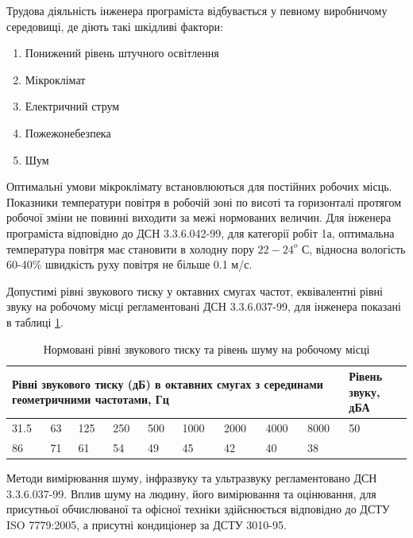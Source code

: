 \documentclass[ukrainian,utf8,simple,floatsubsection, hpadding=5mm,equationsubsection,]{eskdtext}
\begin{document}
Трудова діяльність інженера програміста відбувається у певному виробничому середовищі, де діють такі шкідливі фактори: 
\begin{enumerate}
  \item Понижений рівень штучного освітлення 
  \item Мікроклімат
  \item Електричний струм
  \item Пожежонебезпека
  \item Шум

\end{enumerate}
% 


Оптимальні умови мікроклімату встановлюються для постійних робочих місць. Показники температури повітря в робочій зоні по висоті та горизонталі протягом робочої зміни не повинні виходити за межі нормованих величин. Для інженера програміста відповідно до ДСН 3.3.6.042-99, для категорії робіт 1а, оптимальна температура повітря має становити в холодну пору $22-24^o$ С, відносна вологість 60-40\% швидкість руху повітря не більше 0.1 м/с.

Допустимі рівні звукового тиску у октавних смугах частот, еквівалентні рівні звуку на робочому місці регламентовані ДСН 3.3.6.037-99, для інженера показані в таблиці \ref{tb:noise}.
\begin{table}[H]
\small
\caption{Нормовані рівні звукового тиску та рівень шуму на робочому місці}
\centering
\begin{tabular}{|p{0.4in}|p{0.4in}|p{0.4in}|p{0.4in}|p{0.4in}|p{0.4in}|p{0.4in}|p{0.4in}|p{0.4in}|p{0.4in}|} \hline 
\multicolumn{9}{|p{4in}|}{Рівні звукового тиску (дБ) в  октавних смугах з серединами геометричними частотами, Гц} & Рівень звуку, дБА \\ \hline 
31.5 & 63 & 125 & 250 & 500 & 1000 & 2000 & 4000 & 8000 & 50 \\ \hline 
86 & 71 & 61 & 54 & 49 & 45 & 42 & 40 & 38 &  \\ \hline 
\end{tabular}
\label{tb:noise}
\end{table}
Методи вимірювання шуму, інфразвуку та ультразвуку регламентовано ДСН 3.3.6.037-99. Вплив шуму на людину, його вимірювання та оцінювання, для присутньої обчислюваної та офісної техніки здійснюється відповідно до ДСТУ ISO 7779:2005, а присутні кондиціонер за ДСТУ 3010-95. 
\end{document}
